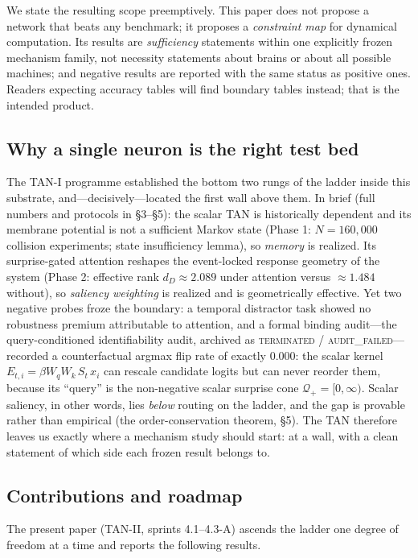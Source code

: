 We state the resulting scope preemptively. This paper does not propose a
network that beats any benchmark; it proposes a \emph{constraint map} for
dynamical computation. Its results are \emph{sufficiency} statements within
one explicitly frozen mechanism family, not necessity statements about
brains or about all possible machines; and negative results are reported
with the same status as positive ones. Readers expecting accuracy tables
will find boundary tables instead; that is the intended product.

\subsection{Why a single neuron is the right test bed}
\label{sec:testbed}

The TAN-I programme established the bottom two rungs of the ladder inside
this substrate, and---decisively---located the first wall above them. In
brief (full numbers and protocols in §3--§5): the scalar TAN is
historically dependent and its membrane potential is not a sufficient
Markov state (Phase 1: $N=160{,}000$ collision experiments; state
insufficiency lemma), so \emph{memory} is realized. Its surprise-gated
attention reshapes the event-locked response geometry of the system
(Phase 2: effective rank $d_D\approx2.089$ under attention versus
$\approx1.484$ without), so \emph{saliency weighting} is realized and is
geometrically effective. Yet two negative probes froze the boundary:
a temporal distractor task showed no robustness premium attributable to
attention, and a formal binding audit---the query-conditioned
identifiability audit, archived as \textsc{terminated /
audit\_failed}---recorded a counterfactual argmax flip rate of exactly
$0.000$: the scalar kernel $E_{t,i}=\beta W_qW_k\,S_t\,x_i$ can rescale
candidate logits but can never reorder them, because its ``query'' is the
non-negative scalar surprise cone $\mathcal{Q}_+=[0,\infty)$. Scalar
saliency, in other words, lies \emph{below} routing on the ladder, and the
gap is provable rather than empirical (the order-conservation theorem,
§5). The TAN therefore leaves us exactly where a mechanism study should
start: at a wall, with a clean statement of which side each frozen result
belongs to.

\subsection{Contributions and roadmap}
\label{sec:contrib}

The present paper (TAN-II, sprints 4.1--4.3-A) ascends the ladder one degree
of freedom at a time and reports the following results.

